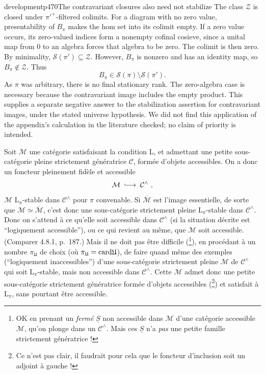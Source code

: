 \begin{dcomment}{development}{p470}{The contravariant closures also need not stabilize}
The class $\mathcal Z$ is closed under $\pi'^+$-filtered colimits. For a diagram with no zero value, presentability of $B_\pi$ makes the hom set into its colimit empty. If a zero value occurs, its zero-valued indices form a nonempty cofinal cosieve, since a unital map from $0$ to an algebra forces that algebra to be zero. The colimit is then zero. By minimality, $\mathcal S(\pi')\subseteq\mathcal Z$. However, $B_\pi$ is nonzero and has an identity map, so $B_\pi\notin\mathcal Z$. Thus
\[
 B_\pi\in\mathcal S(\pi)\setminus\mathcal S(\pi').
\]
As $\pi$ was arbitrary, there is no final stationary rank. The zero-algebra case is necessary because the contravariant image includes the empty product. This supplies a separate negative answer to the stabilization assertion for contravariant images, under the stated universe hypothesis. We did not find this application of the appendix's calculation in the literature checked; no claim of priority is intended.
\end{dcomment}


Soit $\mathcal{M}$ une catégorie satisfaisant la condition L, et admettant une petite sous-catégorie pleine strictement génératrice $\mathcal{C}$, formée d'objets accessibles. On a donc un foncteur pleinement fidèle et accessible
\[
\mathcal{M} \;\into\; \mathcal{C}^\wedge\ ,
\]
$\mathcal{M}$ $\mathrm{L}_\pi$-stable dans $\mathcal{C}^\wedge$ pour $\pi$ convenable. Si $\overline{\mathcal{M}}$ est l'image essentielle, de sorte que $\mathcal{M} \simeq \overline{\mathcal{M}}$, c'est donc une sous-catégorie strictement pleine $\mathrm{L}_\pi$-stable dans $\mathcal{C}^\wedge$. Donc on s'attend à ce qu'elle soit accessible dans $\mathcal{C}^\wedge$ (si la situation décrite est “logiquement accessible”), ou ce qui revient au même, que $\mathcal{M}$ soit accessible. (Comparer 4.8.1, p.~187.) Mais il ne doit pas être difficile (\footnote[192]{OK en prenant un \textit{fermé} $\underline{S}$ non accessible dans $\mathcal{M}$ d'une catégorie accessible $\mathcal{M}$, qu'on plonge dans un $\mathcal{C}^\wedge$. Mais ces $\underline{S}$ n'a \textit{pas} une petite famille strictement génératrice ! %
}), en procédant à un nombre $\pi_{\mathfrak{U}}$ de choix (où $\pi_{\mathfrak{U}} = \mathrm{card}\mathfrak{U}$), de faire quand même des exemples (“logiquement inaccessibles”) d'une sous-catégorie strictement pleine $\mathcal{M}$ de $\mathcal{C}^\wedge$ qui soit $\mathrm{L}_\pi$-stable, mais non accessible dans $\mathcal{C}^\wedge$. Cette $\mathcal{M}$ admet donc une petite sous-catégorie strictement génératrice formée d'objets accessibles (\footnote[193]{Ce n'est pas clair, il faudrait pour cela que le foncteur d'inclusion soit un adjoint à gauche !}) et satisfait à $\mathrm{L}_\pi$, sans pourtant être accessible.

